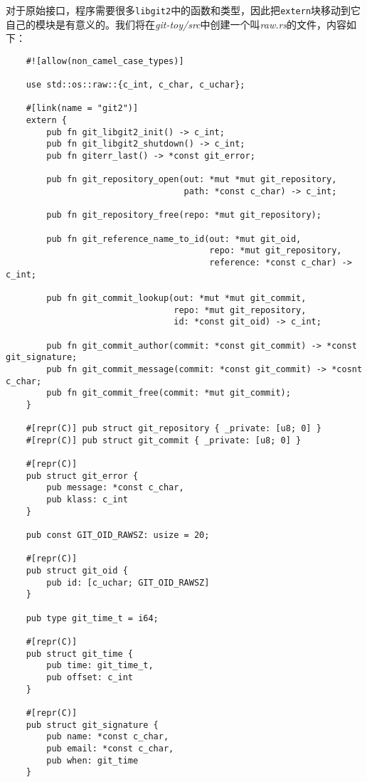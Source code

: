 对于原始接口，程序需要很多\texttt{libgit2}中的函数和类型，因此把\texttt{extern}块移动到它自己的模块是有意义的。我们将在\emph{git-toy/src}中创建一个叫\emph{raw.rs}的文件，内容如下：
\begin{verbatim}
    #![allow(non_camel_case_types)]

    use std::os::raw::{c_int, c_char, c_uchar};

    #[link(name = "git2")]
    extern {
        pub fn git_libgit2_init() -> c_int;
        pub fn git_libgit2_shutdown() -> c_int;
        pub fn giterr_last() -> *const git_error;

        pub fn git_repository_open(out: *mut *mut git_repository,
                                   path: *const c_char) -> c_int;
        
        pub fn git_repository_free(repo: *mut git_repository);
        
        pub fn git_reference_name_to_id(out: *mut git_oid,
                                        repo: *mut git_repository,
                                        reference: *const c_char) -> c_int;
        
        pub fn git_commit_lookup(out: *mut *mut git_commit,
                                 repo: *mut git_repository,
                                 id: *const git_oid) -> c_int;

        pub fn git_commit_author(commit: *const git_commit) -> *const git_signature;
        pub fn git_commit_message(commit: *const git_commit) -> *cosnt c_char;
        pub fn git_commit_free(commit: *mut git_commit);
    }

    #[repr(C)] pub struct git_repository { _private: [u8; 0] }
    #[repr(C)] pub struct git_commit { _private: [u8; 0] }

    #[repr(C)]
    pub struct git_error {
        pub message: *const c_char,
        pub klass: c_int
    }

    pub const GIT_OID_RAWSZ: usize = 20;

    #[repr(C)]
    pub struct git_oid {
        pub id: [c_uchar; GIT_OID_RAWSZ]
    }

    pub type git_time_t = i64;

    #[repr(C)]
    pub struct git_time {
        pub time: git_time_t,
        pub offset: c_int
    }

    #[repr(C)]
    pub struct git_signature {
        pub name: *const c_char,
        pub email: *const c_char,
        pub when: git_time
    }
\end{verbatim}

